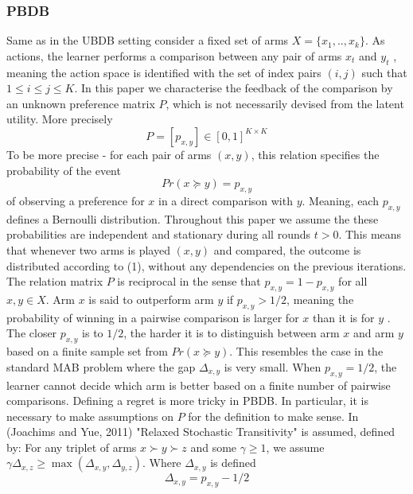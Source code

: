 \documentclass{llncs}
\begin{document}
	\subsubsection{PBDB}	
		Same as in the UBDB setting	consider a fixed set of arms $X = \{x_1,..,x_k\}$. 
		As actions, the learner performs a comparison between any pair of arms $x_t$ and $y_t$ , meaning the action space is identified with the set of index pairs $(i, j)$ such that $1 \leq i \leq j \leq K$. 
		In this paper we characterise the feedback of the comparison by an unknown preference matrix $P$, which is not necessarily devised from the latent utility.
		More precisely
		$$P = [p_{x,y}] \in [0,1]^{K \times K} $$
		To be more precise - for each pair of arms $(x ,y)$, this relation specifies the probability of the event
		\begin{equation}
		Pr(x \succeq y) = p_{x, y}
		\end{equation}
		of observing a preference for $x$ in a direct comparison with $y$. 
		Meaning, each $p_{x,y}$ defines a Bernoulli distribution.
		Throughout this paper we assume the these probabilities are independent and stationary during all rounds $t > 0$.		
		This means that whenever two arms is played $(x ,y)$ and compared, the outcome is distributed according to (1), without any dependencies on the previous iterations.
		The relation matrix $P$ is reciprocal in the sense that $p_{x,y} = 1-p_{x,y}$ for all $x,y \in X$.		
		Arm $x$ is said to outperform arm $y$ if $p_{x,y} > 1/2$, meaning the probability of winning in a pairwise comparison is larger for $x$ than it is for $y$ . 
		The closer $p_{x,y}$ is to $1/2$, the harder it is to distinguish between arm $x$ and arm $y$ based on a finite sample set from $Pr(x \succeq y)$. This resembles the case in the standard MAB problem where the gap $\Delta_{x,y}$ is very small.
		 When $p_{x,y} = 1/2$, the learner cannot decide which arm is better based on a finite number of pairwise comparisons.
		 Defining a regret is more tricky in PBDB. In particular, it is necessary to make assumptions on $P$ for the definition to make sense.
		 In (Joachims and Yue, 2011) "Relaxed Stochastic Transitivity" is assumed, defined by:
		 For any triplet of arms $x \succ y \succ z$ and some $ \gamma \geq 1 $, 
		 we assume $\gamma \Delta_{x,z} \geq \max(\Delta_{x,y},\Delta_{y,z})$.
		 Where $\Delta_{x,y}$ is defined		 
		 $$ \Delta_{x,y} = p_{x,y} - 1/2$$
\end{document}
